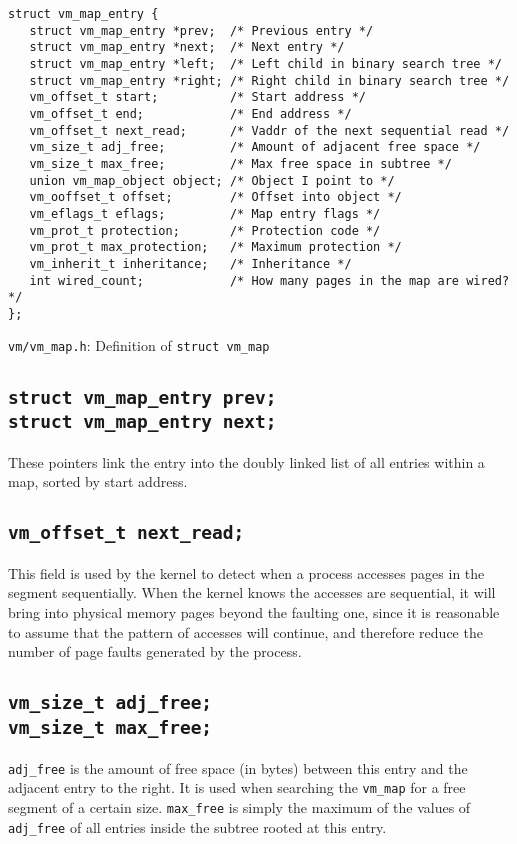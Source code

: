 \documentclass[shortabstract, english]{iithesis}
\begin{document}
\begin{listing}[H]
\begin{verbatim}
struct vm_map_entry {
   struct vm_map_entry *prev;  /* Previous entry */
   struct vm_map_entry *next;  /* Next entry */
   struct vm_map_entry *left;  /* Left child in binary search tree */
   struct vm_map_entry *right; /* Right child in binary search tree */
   vm_offset_t start;          /* Start address */
   vm_offset_t end;            /* End address */
   vm_offset_t next_read;      /* Vaddr of the next sequential read */
   vm_size_t adj_free;         /* Amount of adjacent free space */
   vm_size_t max_free;         /* Max free space in subtree */
   union vm_map_object object; /* Object I point to */
   vm_ooffset_t offset;        /* Offset into object */
   vm_eflags_t eflags;         /* Map entry flags */
   vm_prot_t protection;       /* Protection code */
   vm_prot_t max_protection;   /* Maximum protection */
   vm_inherit_t inheritance;   /* Inheritance */
   int wired_count;            /* How many pages in the map are wired? */
};
\end{verbatim}
\caption{\texttt{vm/vm\_map.h}: Definition of \texttt{struct vm_map}}
\end{listing}

\subsection*{\texttt{struct vm_map_entry prev;}\\
  \texttt{struct vm_map_entry next;}}
These pointers link the entry into the doubly linked list of all entries within
a map, sorted by start address.

\subsection*{\texttt{vm_offset_t next_read;}}
This field is used by the kernel to detect when a process accesses pages in the
segment sequentially. When the kernel knows the accesses are sequential, it will
bring into physical memory pages beyond the faulting one, since it is reasonable
to assume that the pattern of accesses will continue, and therefore reduce the
number of page faults generated by the process.

\subsection*{\texttt{vm_size_t adj_free;}\\
  \texttt{vm_size_t max_free;}}
\texttt{adj_free} is the amount of free space (in bytes) between this
entry and the adjacent entry to the right. It is used when searching the
\texttt{vm_map} for a free segment of a certain size.
\texttt{max_free} is simply the maximum of the values of
\texttt{adj_free} of all entries inside the subtree rooted at this entry.
\end{document}
